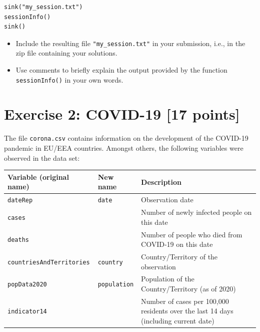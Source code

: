 \documentclass[a4paper,11pt]{article}
\begin{document}
\begin{lstlisting}
sink("my_session.txt")
sessionInfo()
sink()
\end{lstlisting}

\begin{itemize}
    \item Include the resulting file \texttt{"my\_session.txt"} in your submission, i.e., in the zip file containing your solutions.
    \item Use comments to briefly explain the output provided by the function \texttt{sessionInfo()} in your own words.
\end{itemize}

\vspace{1cm}

\section*{Exercise 2: COVID-19 [17 points]}

The file \texttt{corona.csv} contains information on the development of the COVID-19 pandemic in EU/EEA countries. Amongst others, the following variables were observed in the data set:

\begin{center}
\begin{tabular}{p{5cm} p{3cm} p{6cm}}
\toprule
\textbf{Variable (original name)} & \textbf{New name} & \textbf{Description} \\
\midrule
\texttt{dateRep} & \texttt{date} & Observation date \\
\texttt{cases} & & Number of newly infected people on this date \\
\texttt{deaths} & & Number of people who died from COVID-19 on this date \\
\texttt{countriesAndTerritories} & \texttt{country} & Country/Territory of the observation \\
\texttt{popData2020} & \texttt{population} & Population of the Country/Territory (as of 2020) \\
\texttt{indicator14} & & Number of cases per 100,000 residents over the last 14 days (including current date) \\
\bottomrule
\end{tabular}
\end{center}
\end{document}

